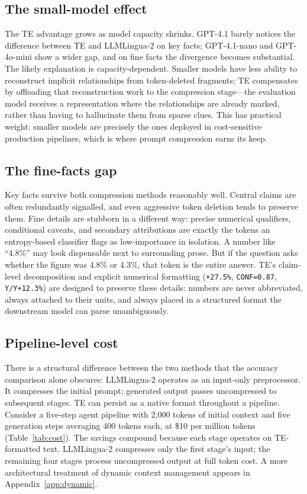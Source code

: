 \documentclass{article}
\begin{document}
\subsection{The small-model effect}

The TE advantage grows as model capacity shrinks. GPT-4.1 barely notices the difference between TE and LLMLingua-2 on key facts; GPT-4.1-nano and GPT-4o-mini show a wider gap, and on fine facts the divergence becomes substantial. The likely explanation is capacity-dependent. Smaller models have less ability to reconstruct implicit relationships from token-deleted fragments; TE compensates by offloading that reconstruction work to the compression stage---the evaluation model receives a representation where the relationships are already marked, rather than having to hallucinate them from sparse clues. This has practical weight: smaller models are precisely the ones deployed in cost-sensitive production pipelines, which is where prompt compression earns its keep.

\subsection{The fine-facts gap}

Key facts survive both compression methods reasonably well. Central claims are often redundantly signalled, and even aggressive token deletion tends to preserve them. Fine details are stubborn in a different way: precise numerical qualifiers, conditional caveats, and secondary attributions are exactly the tokens an entropy-based classifier flags as low-importance in isolation. A number like ``4.8\%'' may look dispensable next to surrounding prose. But if the question asks whether the figure was 4.8\% or 4.3\%, that token is the entire answer. TE's claim-level decomposition and explicit numerical formatting (\texttt{+27.5\%}, \texttt{CONF=0.87}, \texttt{Y/Y+12.3\%}) are designed to preserve these details: numbers are never abbreviated, always attached to their units, and always placed in a structured format the downstream model can parse unambiguously.

\subsection{Pipeline-level cost}
\label{sec:cost}

There is a structural difference between the two methods that the accuracy comparison alone obscures: LLMLingua-2 operates as an input-only preprocessor. It compresses the initial prompt; generated output passes uncompressed to subsequent stages. TE can persist as a native format throughout a pipeline. Consider a five-step agent pipeline with 2{,}000 tokens of initial context and five generation steps averaging 400 tokens each, at \$10 per million tokens (Table~\ref{tab:cost}). The savings compound because each stage operates on TE-formatted text. LLMLingua-2 compresses only the first stage's input; the remaining four stages process uncompressed output at full token cost. A more architectural treatment of dynamic context management appears in Appendix~\ref{app:dynamic}.
\end{document}
